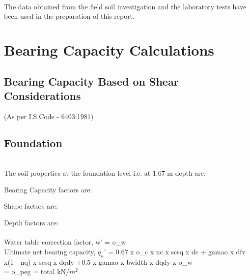 \documentclass{sett}
\begin{document}
 \\ 

 The data obtained from the field soil investigation and the laboratory tests have been used in the
preparation of this report.

\section{Bearing Capacity Calculations}

\subsection{Bearing Capacity Based on Shear Considerations}
(As per I.S.Code - 6403:1981)\\
\subsection{
 Foundation}

 \\

The soil properties at the foundation level i.e. at 1.67 m depth are:\\


Bearing Capacity factors are:\\


Shape factors are:\\


Depth factors are:\\    

\\

Water table correction factor, w' = {{o_w}}\\

Ultimate net bearing capacity, $q_u$' = 0.67 x {{o_c}} x {{nc}} x {{scsq}} x {{dc}} + {{gamao}} x {{dfv}} x(1 - {{nq}}) x {{scsq}} x {{dqdy}} +0.5 x {{gamao}} x {{bwidth}} x {{dqdy}} x {{o_w}}\\
= {{o_peg}} = {{total}} kN/$m^2$ \\	
\end{document}
